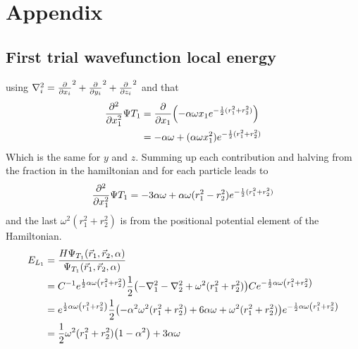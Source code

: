 \documentclass[10pt]{revtex4-1}
\begin{document}
\section{Appendix}

\subsection{First trial wavefunction local energy}

using $\nabla_i^2 = \pdv{x_i}^2 + \pdv{y_i}^2 + \pdv{z_i}^2$ and that
\begin{align}
    \pdv[2]{x_1} \Psi{T_1} &= \pdv{x_1}\qty( -\alpha \omega x_1 e^{-\frac{1}{2}(r_1^2 + r_2^2)} )\nonumber\\
                                &= -\alpha\omega + (\alpha\omega x_1^2)e^{-\frac{1}{2}(r_1^2 + r_2^2)}
\end{align}
Which is the same for $y$ and $z$. Summing up each contribution and halving from the fraction in the hamiltonian and for each particle leads to
\begin{align}
    \pdv[2]{x_1} \Psi{T_1} = -3\alpha\omega + \alpha\omega (r_1^2 - r_2^2)e^{-\frac{1}{2}(r_1^2 + r_2^2)}
\end{align}
and the last $\omega^2 ( r_1^2 + r_2^2 )$ is from the positional potential element of the Hamiltonian.
\begin{align}
    E_{L_1} &= \frac{H \Psi_{T_1} \qty(\vec{r}_1, \vec{r}_2, \alpha )}{\Psi_{T_1} \qty(\vec{r}_1, \vec{r}_2, \alpha )}\nonumber \\
        &= C^{-1} e^{\frac{1}{2}\alpha \omega \qty(r_{1}^{2} + r_{2}^{2})} \frac{1}{2}\qty(-\nabla_1^2 -\nabla_2^2 + \omega^2(r_1^2 + r_2^2))
          C e^{-\frac{1}{2} \alpha \omega \qty(r_1^2 + r_2^2)} \nonumber \\
        &= e^{\frac{1}{2}\alpha \omega \qty(r_{1}^{2} + r_{2}^{2})}
            \frac{1}{2}\qty(-\alpha^2 \omega^2 (r_1^2 + r_2^2) + 6\alpha \omega + \omega^2 (r_1^2 + r_2^2))
            e^{-\frac{1}{2} \alpha \omega \qty(r_1^2 + r_2^2)} \nonumber \\
        &= \frac{1}{2}\omega^2 (r_1^2 + r_2^2)\qty(1 -\alpha^2 ) + 3\alpha \omega \label{eq:naiveLocalEnergyExpanded}
\end{align}
\end{document}
